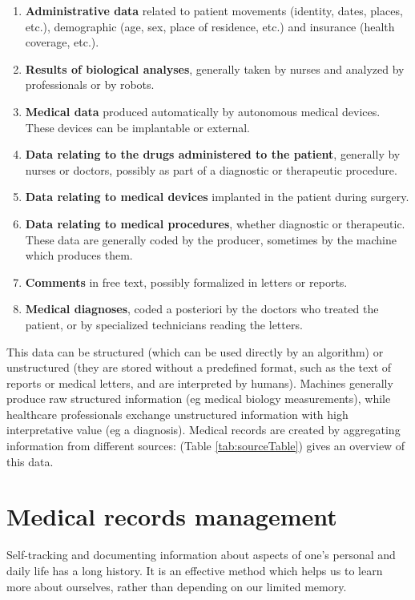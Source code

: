 \begin{enumerate}
  \item \textbf{Administrative data} related to patient movements (identity, dates, places, etc.), demographic (age, sex, place of residence, etc.) and insurance (health coverage, etc.).
  \item \textbf{Results of biological analyses}, generally taken by nurses and analyzed by professionals or by robots.
  \item \textbf{Medical data} produced automatically by autonomous medical devices. These devices can be implantable or external.
  \item \textbf{Data relating to the drugs administered to the patient},
  generally by nurses or doctors, possibly as part of a diagnostic or therapeutic procedure.
  \item \textbf{Data relating to medical devices} implanted in the patient during surgery.
  \item \textbf{Data relating to medical procedures}, whether diagnostic or therapeutic. These data are generally coded by the producer, sometimes by the machine which produces them.
  \item \textbf{Comments} in free text, possibly formalized in letters or reports.
  \item \textbf{Medical diagnoses}, coded a posteriori by the doctors who treated the patient, or by specialized technicians reading the letters\cite{emmanuelchazardReutilisationFouilleDonnees2017}.
\end{enumerate}


\newpage

This data can be structured (which can be used directly by an algorithm) or unstructured (they are stored without a predefined format, such as the text of reports or medical letters, and are interpreted by humans). Machines generally produce raw structured information (eg medical biology measurements), while healthcare professionals exchange unstructured information with high interpretative value (eg a diagnosis). 
Medical records are created by aggregating information from different sources: (Table \ref{tab:sourceTable}) gives an overview of this data\cite{martigneneVisualisationUnifieeDonnees}. 




\section{Medical records management}
Self-tracking and documenting information about aspects of one’s personal and daily life has a long history. It is an effective method which helps us to learn more about ourselves, rather than depending on our limited memory\cite{alrehielyEvaluatingDifferentVisualization}.


